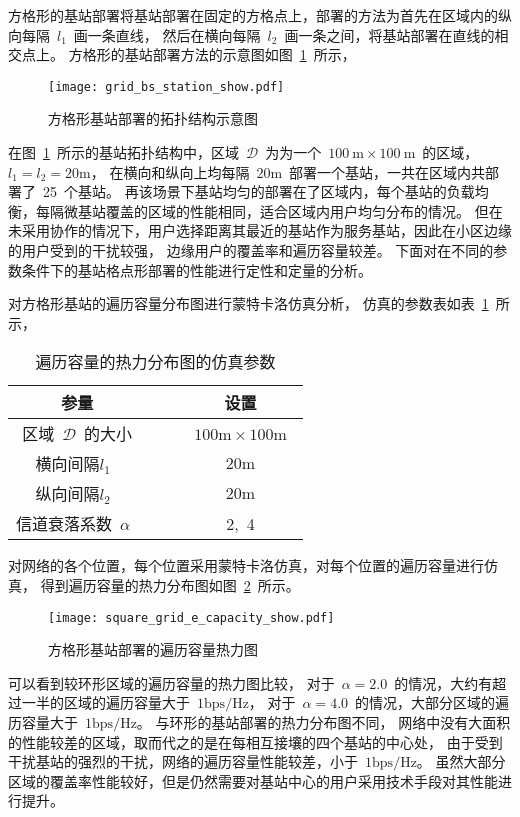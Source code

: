 方格形的基站部署将基站部署在固定的方格点上，部署的方法为首先在区域内的纵向每隔~$l_1$~画一条直线，
然后在横向每隔~$l_2$~画一条之间，将基站部署在直线的相交点上。
方格形的基站部署方法的示意图如图~\ref{grid_bs_station_show}~所示，
\begin{figure}[htbp]
\centering
\texttt{[image: grid\_bs\_station\_show.pdf]}
\caption{方格形基站部署的拓扑结构示意图}\vspace{-0.5em}
\label{grid_bs_station_show}
\end{figure}
在图~\ref{grid_bs_station_show}~所示的基站拓扑结构中，区域~$\mathcal{D}$~为为一个~$100~\mathrm{m}\times 100~ \mathrm{m}$~的区域，
$l_1=l_2=20\mathrm{m}$，
在横向和纵向上均每隔~$20\mathrm{m}$~部署一个基站，一共在区域内共部署了~25~个基站。
再该场景下基站均匀的部署在了区域内，每个基站的负载均衡，每隔微基站覆盖的区域的性能相同，适合区域内用户均匀分布的情况。
但在未采用协作的情况下，用户选择距离其最近的基站作为服务基站，因此在小区边缘的用户受到的干扰较强，
边缘用户的覆盖率和遍历容量较差。
下面对在不同的参数条件下的基站格点形部署的性能进行定性和定量的分析。

对方格形基站的遍历容量分布图进行蒙特卡洛仿真分析，
仿真的参数表如表~\ref{square_grid_sinr_sim_para}~所示，
\begin{table}[htbp]
\caption{遍历容量的热力分布图的仿真参数}
\label{square_grid_sinr_sim_para}
\vspace{0.5em}\centering\wuhao
\begin{tabular}{cccc}
\toprule[1.5pt]
参量 & & & 设置 \\
\midrule[0.5pt]
区域~$\mathcal{D}$~的大小  & & & ~$100\mathrm{m} \times 100 \mathrm{m}$~ \\
横向间隔$l_1$~ & & &  ${20\mathrm{m}}$\\
纵向间隔$l_2$~ & & &  ${20\mathrm{m}}$\\
信道衰落系数~$\alpha$~  & & & 2,~4\\
\bottomrule[1.5pt]
\end{tabular}
\end{table}
对网络的各个位置，每个位置采用蒙特卡洛仿真，对每个位置的遍历容量进行仿真，
得到遍历容量的热力分布图如图~\ref{square_grid_e_capacity_show}~所示。
\begin{figure}[htbp]
\centering
\texttt{[image: square\_grid\_e\_capacity\_show.pdf]}
\caption{方格形基站部署的遍历容量热力图}\vspace{-0.5em}
\label{square_grid_e_capacity_show}
\end{figure}
可以看到较环形区域的遍历容量的热力图比较，
对于~$\alpha=2.0$~的情况，大约有超过一半的区域的遍历容量大于~$1\mathrm{bps/Hz}$，
对于~$\alpha=4.0$~的情况，大部分区域的遍历容量大于~$1\mathrm{bps/Hz}$。
与环形的基站部署的热力分布图不同，
网络中没有大面积的性能较差的区域，取而代之的是在每相互接壤的四个基站的中心处，
由于受到干扰基站的强烈的干扰，网络的遍历容量性能较差，小于~$1\mathrm{bps/Hz}$。
虽然大部分区域的覆盖率性能较好，但是仍然需要对基站中心的用户采用技术手段对其性能进行提升。


